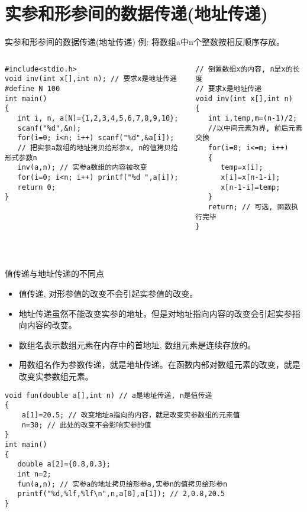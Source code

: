 \section{实参和形参间的数据传递(地址传递)}

\begin{frame}{实参和形参间的数据传递(地址传递)}
例: 将数组a中n个整数按相反顺序存放。
\begin{columns}[T]
\begin{lstlisting}
#include<stdio.h> 
void inv(int x[],int n); // 要求x是地址传递
#define N 100 
int main() 
{
   int i, n, a[N]={1,2,3,4,5,6,7,8,9,10};
   scanf("%d",&n);
   for(i=0; i<n; i++) scanf("%d",&a[i]);
   // 把实参a数组的地址拷贝给形参x, n的值拷贝给形式参数n
   inv(a,n); // 实参a数组的内容被改变
   for(i=0; i<n; i++) printf("%d ",a[i]);
   return 0; 
}
\end{lstlisting}
\begin{lstlisting}
// 倒置数组x的内容, n是x的长度
// 要求x是地址传递
void inv(int x[],int n) 
{  
   int i,temp,m=(n-1)/2;
   //以中间元素为界, 前后元素交换
   for(i=0; i<=m; i++) 
   {
      temp=x[i]; 
      x[i]=x[n-1-i]; 
      x[n-1-i]=temp;
   }
   return; // 可选, 函数执行完毕
}
\end{lstlisting}
\end{columns}
~\\
\end{frame}

\begin{frame}{值传递与地址传递的不同点}
\begin{itemize}
	\item 值传递, 对形参值的改变不会引起实参值的改变。
	\item 地址传递虽然不能改变实参的地址，但是对地址指向内容的改变会引起实参指向内容的改变。
	\item 数组名表示数组元素在内存中的首地址, 数组元素是连续存放的。
	\item 用数组名作为参数传递，就是地址传递。在函数内部对数组元素的改变，就是改变实参数组元素。
\end{itemize}
\begin{lstlisting}
void fun(double a[],int n) // a是地址传递, n是值传递
{
    a[1]=20.5; // 改变地址a指向的内容，就是改变实参数组的元素值
    n=30; // 此处的改变不会影响实参的值
}
int main()
{
   double a[2]={0.8,0.3};
   int n=2;
   fun(a,n); // 实参a的地址拷贝给形参a,实参n的值拷贝给形参n
   printf("%d,%lf,%lf\n",n,a[0],a[1]); // 2,0.8,20.5
}
\end{lstlisting}
\end{frame}


